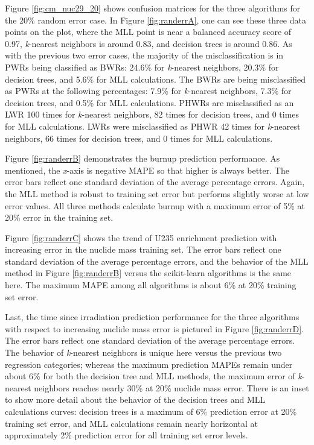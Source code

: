 Figure \ref{fig:cm_nuc29_20} shows confusion matrices for the three algorithms
for the 20\% random error case. In Figure \ref{fig:randerrA}, one can see these
three data points on the plot, where the \gls{MLL} point is near a balanced
accuracy score of 0.97, \textit{k}-nearest neighbors is around 0.83, and
decision trees is around 0.86. As with the previous two error cases, the
majority of the misclassification is in \gls{PWR}s being classified as
\gls{BWR}s: 24.6\% for \textit{k}-nearest neighbors, 20.3\% for decision trees,
and 5.6\% for \gls{MLL} calculations.  The \gls{BWR}s are being misclassified
as \gls{PWR}s at the following percentages: 7.9\% for \textit{k}-nearest
neighbors, 7.3\% for decision trees, and 0.5\% for \gls{MLL} calculations.
\Gls{PHWR}s are misclassified as an \gls{LWR} 100 times for \textit{k}-nearest
neighbors, 82 times for decision trees, and 0 times for \gls{MLL} calculations.
\Gls{LWR}s were misclassified as \gls{PHWR} 42 times for \textit{k}-nearest
neighbors, 66 times for decision trees, and 0 times for \gls{MLL} calculations.


Figure \ref{fig:randerrB} demonstrates the burnup prediction performance.  As
mentioned, the \textit{x}-axis is negative \gls{MAPE} so that higher is always
better.  The error bars reflect one standard deviation of the average
percentage errors.  Again, the \gls{MLL} method is robust to training set error
but performs slightly worse at low error values.  All three methods calculate
burnup with a maximum error of 5\% at 20\% error in the training set.  

Figure \ref{fig:randerrC} shows the trend of \gls{U235} enrichment prediction
with increasing error in the nuclide mass training set.  The error bars reflect
one standard deviation of the average percentage errors, and the behavior of
the \gls{MLL} method in Figure \ref{fig:randerrB} versus the scikit-learn
algorithms is the same here.  The maximum \gls{MAPE} among all algorithms is
about 6\% at 20\% training set error. 

Last, the time since irradiation prediction performance for the three
algorithms with respect to increasing nuclide mass error is pictured in Figure
\ref{fig:randerrD}.  The error bars reflect one standard deviation of the
average percentage errors.  The behavior of \textit{k}-nearest neighbors is
unique here versus the previous two regression categories; whereas the maximum
prediction \gls{MAPE}s remain under about 6\% for both the decision tree and
\gls{MLL} methods, the maximum error of \textit{k}-nearest neighbors reaches
nearly 30\% at 20\% nuclide mass error.  There is an inset to show more detail
about the behavior of the decision trees and \gls{MLL} calculations curves:
decision trees is a maximum of 6\% prediction error at 20\% training set error,
and \gls{MLL} calculations remain nearly horizontal at approximately 2\%
prediction error for all training set error levels.   


